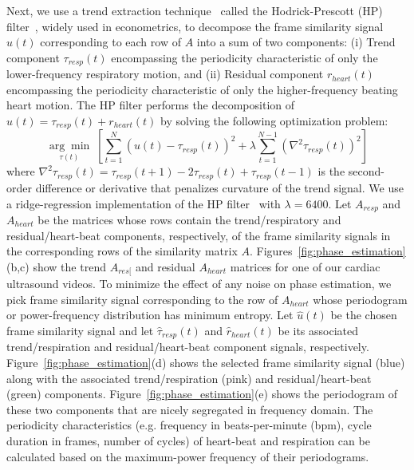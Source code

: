 \documentclass[runningheads,a4paper]{llncs}
\newcommand{\argmin}[1]{\underset{#1}{\operatorname{arg}\operatorname{min}}\;}
\begin{document}
	Next, we use a trend extraction technique~\cite{Alexandrov2012} called the Hodrick-Prescott (HP) filter~\cite{Hodrick1997}, widely used in econometrics, to decompose the frame similarity signal $u(t)$ corresponding to each row of $A$ into a sum of two components: (i) Trend component $\tau_{resp}(t)$ encompassing the periodicity characteristic of only the lower-frequency respiratory motion, and (ii) Residual component $r_{heart}(t)$ encompassing the periodicity characteristic of only the higher-frequency beating heart motion. The HP filter performs the decomposition of $u(t) = \tau_{resp}(t) + r_{heart}(t)$ by solving the following optimization problem:
\begin{equation}	
\argmin{\tau(t)} \left[ \sum_{t=1}^{N}  \left(u(t) - \tau_{resp}(t) \right)^2  + \lambda \sum_{t=1}^{N-1} \left( \nabla^2 \tau_{resp}(t) \right)^2 \right] 
\end{equation}
where $\nabla^2\tau_{resp}(t) = \tau_{resp}(t+1) - 2 \tau_{resp}(t) + \tau_{resp}(t-1)$ is the second-order difference or derivative that penalizes curvature of the trend signal. We use a ridge-regression implementation of the HP filter~\cite{Yamada2015} with $\lambda=6400$. Let $A_{resp}$ and $A_{heart}$ be the matrices whose rows contain the trend/respiratory and residual/heart-beat components, respectively, of the frame similarity signals in the corresponding rows of the similarity matrix $A$. Figures~\ref{fig:phase_estimation}(b,c) show the trend $A_{res[}$ and residual $A_{heart}$ matrices for one of our cardiac ultrasound videos. To minimize the effect of any noise on phase estimation, we pick frame similarity signal corresponding to the row of $A_{heart}$ whose periodogram or power-frequency distribution has minimum entropy. Let $\hat{u}(t)$ be the chosen frame similarity signal and let $\hat{\tau}_{resp}(t)$ and $\hat{r}_{heart}(t)$  be its associated trend/respiration and residual/heart-beat component signals, respectively. Figure~\ref{fig:phase_estimation}(d) shows the selected frame similarity signal (blue) along with the associated trend/respiration (pink) and residual/heart-beat (green) components. Figure~\ref{fig:phase_estimation}(e) shows the periodogram of these two components that are nicely segregated in frequency domain. The periodicity characteristics (e.g. frequency in beats-per-minute (bpm), cycle duration in frames, number of cycles) of heart-beat and respiration can be calculated based on the maximum-power frequency of their periodograms.
		
\end{document}
